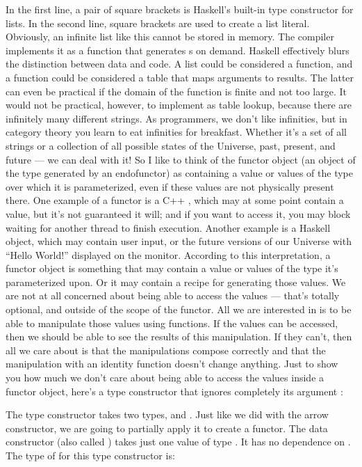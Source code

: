 In the first line, a pair of square brackets is Haskell's built-in
type constructor for lists. In the second line, square brackets are used
to create a list literal. Obviously, an infinite list like this cannot
be stored in memory. The compiler implements it as a function that
generates s on demand. Haskell effectively blurs the
distinction between data and code. A list could be considered a
function, and a function could be considered a table that maps arguments
to results. The latter can even be practical if the domain of the
function is finite and not too large. It would not be practical,
however, to implement  as table lookup, because there are
infinitely many different strings. As programmers, we don't like
infinities, but in category theory you learn to eat infinities for
breakfast. Whether it's a set of all strings or a collection of all
possible states of the Universe, past, present, and future --- we can
deal with it! So I like to think of the functor object (an object of the
type generated by an endofunctor) as containing a value or values of the
type over which it is parameterized, even if these values are not
physically present there. One example of a functor is a C++
, which may at some point contain a value, but it's
not guaranteed it will; and if you want to access it, you may block
waiting for another thread to finish execution. Another example is a
Haskell  object, which may contain user input, or the future
versions of our Universe with ``Hello World!'' displayed on the monitor.
According to this interpretation, a functor object is something that may
contain a value or values of the type it's parameterized upon. Or it may
contain a recipe for generating those values. We are not at all
concerned about being able to access the values --- that's totally
optional, and outside of the scope of the functor. All we are interested
in is to be able to manipulate those values using functions. If the
values can be accessed, then we should be able to see the results of
this manipulation. If they can't, then all we care about is that the
manipulations compose correctly and that the manipulation with an
identity function doesn't change anything. Just to show you how much we
don't care about being able to access the values inside a functor
object, here's a type constructor that ignores completely its argument
:

The  type constructor takes two types,  and
. Just like we did with the arrow constructor, we are going to
partially apply it to create a functor. The data constructor (also
called ) takes just one value of type . It has
no dependence on . The type of  for this type
constructor is:

